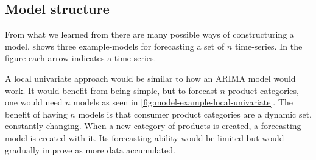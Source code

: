 \subsection{Model structure}



From what we learned from 
there are many possible ways of constructuring a model.
 shows three example-models for forecasting a set of $n$ time-series.
In the figure each arrow indicates a time-series.

A local univariate approach would be similar to how an ARIMA model would work.
It would benefit from being simple, but to forecast $n$ product categories,
one would need $n$ models as seen in \cref{fig:model-example-local-univariate}.
The benefit of having $n$ models is that consumer product categories are a dynamic set, constantly changing.
When a new category of products is created, a forecasting model is created with it. Its forecasting ability
would be limited but would gradually improve as more data accumulated.

